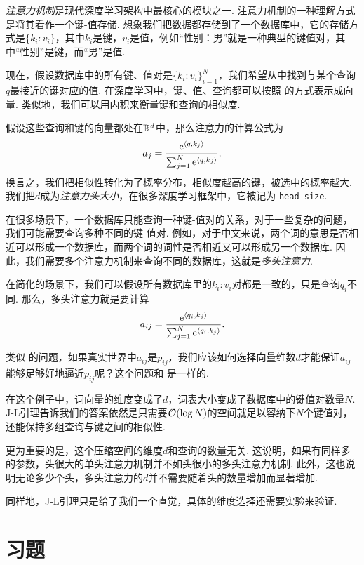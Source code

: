 \begin{example}[多头注意力]
\textit{注意力机制}是现代深度学习架构中最核心的模块之一. 注意力机制的一种理解方式是将其看作一个键-值存储. 想象我们把数据都存储到了一个数据库中，它的存储方式是$\{k_i:v_i\}$，其中$k_i$是键，$v_i$是值，例如“性别：男”就是一种典型的键值对，其中“性别”是键，而“男”是值. 

现在，假设数据库中的所有键、值对是$\{k_i:v_i\}_{i=1}^N$，我们希望从中找到与某个查询$q$最接近的键对应的值. 在深度学习中，键、值、查询都可以按照 的方式表示成向量. 类似地，我们可以用内积来衡量键和查询的相似度. 

假设这些查询和键的向量都处在$\mathbb{R}^d$中，那么注意力的计算公式为
\[
    a_j = \frac{\mathrm{e}^{\left\langle{q},{k_j}\right\rangle}}{\sum_{j=1}^N \mathrm{e}^{\left\langle{q},{k_j}\right\rangle}}.
\]
换言之，我们把相似性转化为了概率分布，相似度越高的键，被选中的概率越大. 我们把$d$成为\textit{注意力头大小}，在很多深度学习框架中，它被记为 \verb#head_size#.

在很多场景下，一个数据库只能查询一种键-值对的关系，对于一些复杂的问题，我们可能需要查询多种不同的键-值对. 例如，对于中文来说，两个词的意思是否相近可以形成一个数据库，而两个词的词性是否相近又可以形成另一个数据库. 因此，我们需要多个注意力机制来查询不同的数据库，这就是\textit{多头注意力}.

在简化的场景下，我们可以假设所有数据库里的$k_i:v_i$对都是一致的，只是查询$q_i$不同. 那么，多头注意力就是要计算
\[
    a_{ij} = \frac{\mathrm{e}^{\left\langle{q_i},{k_j}\right\rangle}}{\sum_{j=1}^N \mathrm{e}^{\left\langle{q_i},{k_j}\right\rangle}}.
\]

类似 的问题，如果真实世界中$a_{ij}$是$p_{ij}$，我们应该如何选择向量维数$d$才能保证$a_{ij}$能够足够好地逼近$p_{ij}$呢？这个问题和 是一样的.

在这个例子中，词向量的维度变成了$d$，词表大小变成了数据库中的键值对数量$N$. J-L引理告诉我们的答案依然是只需要$\mathcal{O}(\log N)$的空间就足以容纳下$N$个键值对，还能保持多组查询与键之间的相似性. 

更为重要的是，这个压缩空间的维度$d$和查询的数量无关. 这说明，如果有同样多的参数，头很大的单头注意力机制并不如头很小的多头注意力机制. 此外，这也说明无论多少个头，多头注意力的$d$并不需要随着头的数量增加而显著增加.

同样地，J-L引理只是给了我们一个直觉，具体的维度选择还需要实验来验证.
\end{example}

\section{习题}

